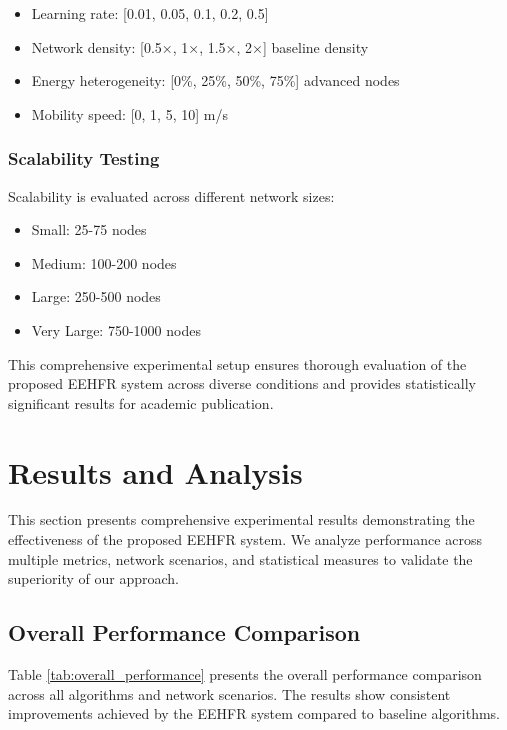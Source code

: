 \documentclass[conference]{IEEEtran}
\begin{document}
\begin{itemize}
    \item Learning rate: [0.01, 0.05, 0.1, 0.2, 0.5]
    \item Network density: [0.5×, 1×, 1.5×, 2×] baseline density
    \item Energy heterogeneity: [0\%, 25\%, 50\%, 75\%] advanced nodes
    \item Mobility speed: [0, 1, 5, 10] m/s
\end{itemize}

\subsubsection{Scalability Testing}

Scalability is evaluated across different network sizes:
\begin{itemize}
    \item Small: 25-75 nodes
    \item Medium: 100-200 nodes  
    \item Large: 250-500 nodes
    \item Very Large: 750-1000 nodes
\end{itemize}

This comprehensive experimental setup ensures thorough evaluation of the proposed EEHFR system across diverse conditions and provides statistically significant results for academic publication.



\section{Results and Analysis}

This section presents comprehensive experimental results demonstrating the effectiveness of the proposed EEHFR system. We analyze performance across multiple metrics, network scenarios, and statistical measures to validate the superiority of our approach.

\subsection{Overall Performance Comparison}

Table \ref{tab:overall_performance} presents the overall performance comparison across all algorithms and network scenarios. The results show consistent improvements achieved by the EEHFR system compared to baseline algorithms.
\end{document}
